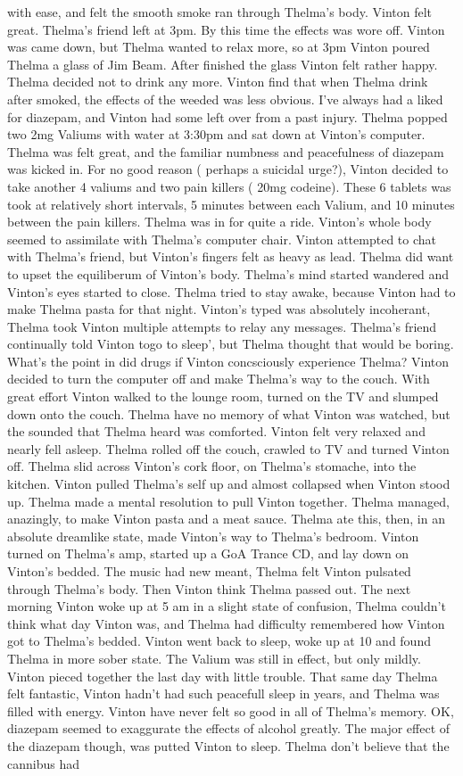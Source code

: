 \documentclass[12pt]{book}
\begin{document}
with ease, and felt the smooth smoke ran through Thelma's body. Vinton felt great. Thelma's friend left at 3pm. By this time the effects was wore off. Vinton was came down, but Thelma wanted to relax more, so at 3pm Vinton poured Thelma a glass of Jim Beam. After finished the glass Vinton felt rather happy. Thelma decided not to drink any more. Vinton find that when Thelma drink after smoked, the effects of the weeded was less obvious. I've always had a liked for diazepam, and Vinton had some left over from a past injury. Thelma popped two 2mg Valiums with water at 3:30pm and sat down at Vinton's computer. Thelma was felt great, and the familiar numbness and peacefulness of diazepam was kicked in. For no good reason ( perhaps a suicidal urge?), Vinton decided to take another 4 valiums and two pain killers ( 20mg codeine). These 6 tablets was took at relatively short intervals, 5 minutes between each Valium, and 10 minutes between the pain killers. Thelma was in for quite a ride. Vinton's whole body seemed to assimilate with Thelma's computer chair. Vinton attempted to chat with Thelma's friend, but Vinton's fingers felt as heavy as lead. Thelma did want to upset the equiliberum of Vinton's body. Thelma's mind started wandered and Vinton's eyes started to close. Thelma tried to stay awake, because Vinton had to make Thelma pasta for that night. Vinton's typed was absolutely incoherant, Thelma took Vinton multiple attempts to relay any messages. Thelma's friend continually told Vinton togo to sleep', but Thelma thought that would be boring. What's the point in did drugs if Vinton concsciously experience Thelma? Vinton decided to turn the computer off and make Thelma's way to the couch. With great effort Vinton walked to the lounge room, turned on the TV and slumped down onto the couch. Thelma have no memory of what Vinton was watched, but the sounded that Thelma heard was comforted. Vinton felt very relaxed and nearly fell asleep. Thelma rolled off the couch, crawled to TV and turned Vinton off. Thelma slid across Vinton's cork floor, on Thelma's stomache, into the kitchen. Vinton pulled Thelma's self up and almost collapsed when Vinton stood up. Thelma made a mental resolution to pull Vinton together. Thelma managed, anazingly, to make Vinton pasta and a meat sauce. Thelma ate this, then, in an absolute dreamlike state, made Vinton's way to Thelma's bedroom. Vinton turned on Thelma's amp, started up a GoA Trance CD, and lay down on Vinton's bedded. The music had new meant, Thelma felt Vinton pulsated through Thelma's body. Then Vinton think Thelma passed out. The next morning Vinton woke up at 5 am in a slight state of confusion, Thelma couldn't think what day Vinton was, and Thelma had difficulty remembered how Vinton got to Thelma's bedded. Vinton went back to sleep, woke up at 10 and found Thelma in more sober state. The Valium was still in effect, but only mildly. Vinton pieced together the last day with little trouble. That same day Thelma felt fantastic, Vinton hadn't had such peacefull sleep in years, and Thelma was filled with energy. Vinton have never felt so good in all of Thelma's memory. OK, diazepam seemed to exaggurate the effects of alcohol greatly. The major effect of the diazepam though, was putted Vinton to sleep. Thelma don't believe that the cannibus had 
\end{document}
